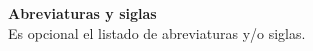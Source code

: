 {\large \color{GrisUAQ} \textbf{Abreviaturas y siglas}}\\
Es opcional el listado de abreviaturas y/o siglas.